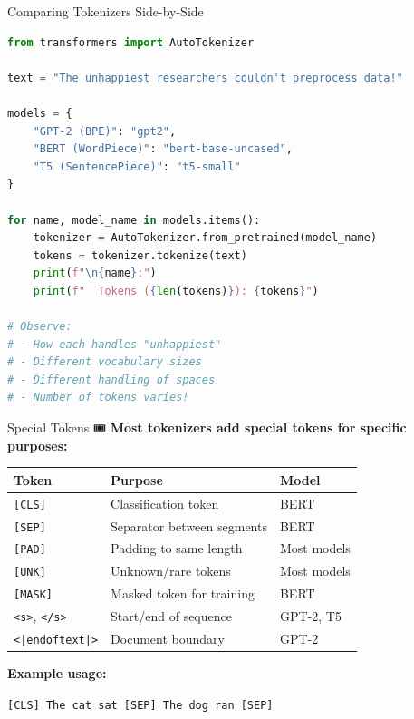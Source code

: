 \documentclass[aspectratio=169]{beamer}
\begin{document}
\begin{frame}[fragile]{Comparing Tokenizers Side-by-Side 🔬}
    \begin{lstlisting}[language=Python]
from transformers import AutoTokenizer

text = "The unhappiest researchers couldn't preprocess data!"

models = {
    "GPT-2 (BPE)": "gpt2",
    "BERT (WordPiece)": "bert-base-uncased",
    "T5 (SentencePiece)": "t5-small"
}

for name, model_name in models.items():
    tokenizer = AutoTokenizer.from_pretrained(model_name)
    tokens = tokenizer.tokenize(text)
    print(f"\n{name}:")
    print(f"  Tokens ({len(tokens)}): {tokens}")

# Observe:
# - How each handles "unhappiest"
# - Different vocabulary sizes
# - Different handling of spaces
# - Number of tokens varies!
    \end{lstlisting}
\end{frame}

\begin{frame}{Special Tokens 🎟️}
    \textbf{Most tokenizers add special tokens for specific purposes:}

    \vspace{0.5em}
    \begin{table}
        \centering
        \begin{tabular}{lll}
            \toprule
            \textbf{Token} & \textbf{Purpose} & \textbf{Model} \\
            \midrule
            \texttt{[CLS]} & Classification token & BERT \\
            \texttt{[SEP]} & Separator between segments & BERT \\
            \texttt{[PAD]} & Padding to same length & Most models \\
            \texttt{[UNK]} & Unknown/rare tokens & Most models \\
            \texttt{[MASK]} & Masked token for training & BERT \\
            \texttt{<s>}, \texttt{</s>} & Start/end of sequence & GPT-2, T5 \\
            \texttt{<|endoftext|>} & Document boundary & GPT-2 \\
            \bottomrule
        \end{tabular}
    \end{table}

    \vspace{0.5em}
    \textbf{Example usage:}
    \begin{center}
        \texttt{[CLS] The cat sat [SEP] The dog ran [SEP]}
    \end{center}
\end{frame}
\end{document}
